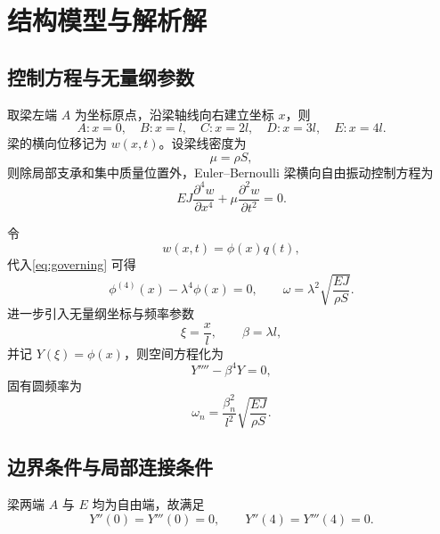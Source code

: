 \documentclass[UTF8,a4paper,zihao=-4]{ctexart}
\begin{document}
\section{结构模型与解析解}

\subsection{控制方程与无量纲参数}

取梁左端 $A$ 为坐标原点，沿梁轴线向右建立坐标 $x$，则
\begin{equation}
A:x=0,\quad B:x=l,\quad C:x=2l,\quad D:x=3l,\quad E:x=4l .
\end{equation}
梁的横向位移记为 $w(x,t)$。设梁线密度为
\begin{equation}
\mu=\rho S ,
\end{equation}
则除局部支承和集中质量位置外，Euler--Bernoulli 梁横向自由振动控制方程为
\begin{equation}
EJ\frac{\partial^4 w}{\partial x^4}+\mu\frac{\partial^2 w}{\partial t^2}=0 .
\label{eq:governing}
\end{equation}

令
\begin{equation}
w(x,t)=\phi(x)q(t),
\end{equation}
代入\cref{eq:governing} 可得
\begin{equation}
\phi^{(4)}(x)-\lambda^4\phi(x)=0,\qquad
\omega=\lambda^2\sqrt{\frac{EJ}{\rho S}} .
\end{equation}
进一步引入无量纲坐标与频率参数
\begin{equation}
\xi=\frac{x}{l},\qquad \beta=\lambda l ,
\end{equation}
并记 $Y(\xi)=\phi(x)$，则空间方程化为
\begin{equation}
Y''''-\beta^4Y=0,
\label{eq:dimensionless_beam}
\end{equation}
固有圆频率为
\begin{equation}
\omega_n=\frac{\beta_n^2}{l^2}\sqrt{\frac{EJ}{\rho S}} .
\label{eq:omega_beta}
\end{equation}

\subsection{边界条件与局部连接条件}

梁两端 $A$ 与 $E$ 均为自由端，故满足
\begin{equation}
Y''(0)=Y'''(0)=0,\qquad
Y''(4)=Y'''(4)=0 .
\end{equation}
\end{document}
